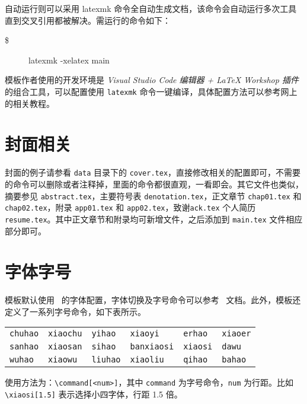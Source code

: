 自动运行则可以采用 latexmk 命令全自动生成文档，该命令会自动运行多次工具直到交叉引用都被解决。需运行的命令如下：
\begin{description}
  \item[\$] latexmk -xelatex main
\end{description}

模板作者使用的开发环境是 \emph{Visual Studio Code 编辑器 + LaTeX Workshop 插件} 的组合工具，可以配置使用 \texttt{latexmk} 命令一键编译，具体配置方法可以参考网上的相关教程。

\section{封面相关}
\label{sec:cover}

封面的例子请参看 \texttt{data} 目录下的 \texttt{cover.tex}，直接修改相关的配置即可，不需要的命令可以删除或者注释掉，里面的命令都很直观，一看即会。其它文件也类似，摘要参见 \texttt{abstract.tex}，主要符号表 \texttt{denotation.tex}，正文章节 \texttt{chap01.tex} 和 \texttt{chap02.tex}，附录 \texttt{app01.tex} 和 \texttt{app02.tex}，致谢\texttt{ack.tex} 个人简历 \texttt{resume.tex}。其中正文章节和附录均可新增文件，之后添加到 \texttt{main.tex} 文件相应部分即可。

\section{字体字号}
\label{sec:font}

模板默认使用 \CTeX\ 的字体配置，字体切换及字号命令可以参考 \CTeX\ 文档。此外，模板还定义了一系列字号命令，如下表所示。

\begin{center}
  \begin{tabular}{llllll}
    \toprule
    \texttt{chuhao} & \texttt{xiaochu} & \texttt{yihao}  & \texttt{xiaoyi}    & \texttt{erhao}  & \texttt{xiaoer}\\
    \texttt{sanhao} & \texttt{xiaosan} & \texttt{sihao}  & \texttt{banxiaosi} & \texttt{xiaosi} & \texttt{dawu}\\
    \texttt{wuhao}  & \texttt{xiaowu}  & \texttt{liuhao} & \texttt{xiaoliu}   & \texttt{qihao}  & \texttt{bahao}\\
    \bottomrule
  \end{tabular}
\end{center}

使用方法为：\verb|\command[<num>]|，其中 \texttt{command} 为字号命令，\texttt{num} 为行距。比如 \verb|\xiaosi[1.5]| 表示选择小四字体，行距 1.5 倍。

